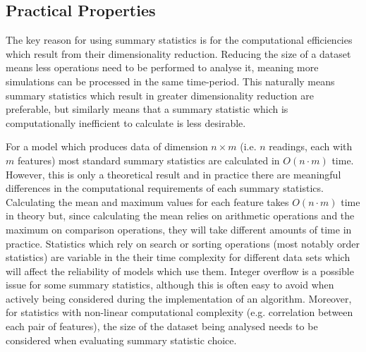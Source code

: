 \documentclass[11pt,a4paper]{article}
\theoremstyle{break}
\begin{document}
\subsection*{Practical Properties}

  \par The key reason for using summary statistics is for the computational efficiencies which result from their dimensionality reduction. Reducing the size of a dataset means less operations need to be performed to analyse it, meaning more simulations can be processed in the same time-period. This naturally means summary statistics which result in greater dimensionality reduction are preferable, but similarly means that a summary statistic which is computationally inefficient to calculate is less desirable.

  \par For a model which produces data of dimension $n\times m$ (i.e. $n$ readings, each with $m$ features) most standard summary statistics are calculated in $O(n\cdot m)$  time. However, this is only a theoretical result and in practice there are meaningful differences in the computational requirements of each summary statistics. Calculating the mean and maximum values for each feature takes $O(n\cdot m)$ time in theory but, since calculating the mean relies on arithmetic operations and the maximum on comparison operations, they will take different amounts of time in practice. Statistics which rely on search or sorting operations (most notably order statistics) are variable in the their time complexity for different data sets which will affect the reliability of models which use them. Integer overflow is a possible issue for some summary statistics, although this is often easy to avoid when actively being considered during the implementation of an algorithm. Moreover, for statistics with non-linear computational complexity (e.g. correlation between each pair of features), the size of the dataset being analysed needs to be considered when evaluating summary statistic choice.
\end{document}
